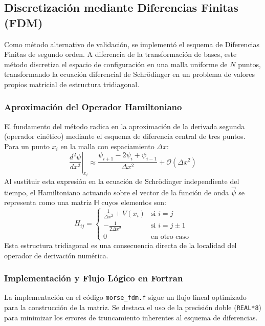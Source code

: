 \documentclass[11pt,fleqn]{article}
\begin{document}

\subsection{Discretización mediante Diferencias Finitas (FDM)}

Como método alternativo de validación, se implementó el esquema de Diferencias Finitas de segundo orden. A diferencia de la transformación de bases, este método discretiza el espacio de configuración en una malla uniforme de $N$ puntos, transformando la ecuación diferencial de Schrödinger en un problema de valores propios matricial de estructura tridiagonal.

\subsubsection{Aproximación del Operador Hamiltoniano}

El fundamento del método radica en la aproximación de la derivada segunda (operador cinético) mediante el esquema de diferencia central de tres puntos. Para un punto $x_i$ en la malla con espaciamiento $\Delta x$:
\begin{equation}
    \left. \frac{d^2\psi}{dx^2} \right|_{x_i} \approx \frac{\psi_{i+1} - 2\psi_i + \psi_{i-1}}{\Delta x^2} + \mathcal{O}(\Delta x^2)
\end{equation}
Al sustituir esta expresión en la ecuación de Schrödinger independiente del tiempo, el Hamiltoniano actuando sobre el vector de la función de onda $\vec{\psi}$ se representa como una matriz $\mathbb{H}$ cuyos elementos son:
\begin{equation}
    H_{ij} = 
    \begin{cases} 
    \frac{1}{\Delta x^2} + V(x_i) & \text{si } i = j \\
    -\frac{1}{2\Delta x^2} & \text{si } i = j \pm 1 \\
    0 & \text{en otro caso}
    \end{cases}
\end{equation}
Esta estructura tridiagonal es una consecuencia directa de la localidad del operador de derivación numérica.

\subsubsection{Implementación y Flujo Lógico en Fortran}

La implementación en el código \texttt{morse\_fdm.f} sigue un flujo lineal optimizado para la construcción de la matriz. Se destaca el uso de la precisión doble (\texttt{REAL*8}) para minimizar los errores de truncamiento inherentes al esquema de diferencias.
\end{document}
